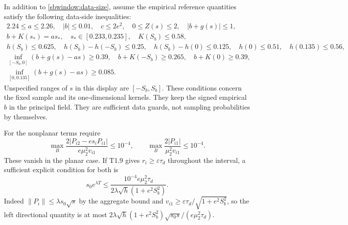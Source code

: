 \documentclass{article} %
\theoremstyle{plain}
\theoremstyle{definition}
\theoremstyle{remark}
\begin{document}
In addition to \eqref{sbwindow:data-size}, assume the empirical reference
quantities satisfy the following data-side inequalities:
\begin{equation}\label{sbwindow:entry-data}
 \begin{gathered}
 2.24\le a\le2.26,\quad |b|\le0.01,\quad
 c\le2e^2,\quad 0\le Z(s)\le2,\quad |b+g(s)|\le1,\\
 b+K(s_*)=as_*,\quad s_*\in[0.233,0.235],\quad K(S_b)\le0.58,\\
 h(S_b)\le0.625,\quad h(S_b)-h(-S_b)\le0.25,\quad
 h(S_b)-h(0)\le0.125,\quad h(0)\le0.51,\quad h(0.135)\le0.56,\\
 \inf_{[-S_b,0]}(b+g(s)-as)\ge0.39,\quad
 b+K(-S_b)\ge0.265,\quad b+K(0)\ge0.39,\\
 \inf_{[0,0.135]}(b+g(s)-as)\ge0.085.
 \end{gathered}
\end{equation}
Unspecified ranges of $s$ in this display are $[-S_b,S_b]$.
These conditions concern the fixed sample and its one-dimensional kernels.
They keep the signed empirical $b$ in the principal field. They are
sufficient data guards, not sampling probabilities by themselves.

For the nonplanar terms require
\begin{equation}\label{sbwindow:ambient}
 \max_B\frac{2|P_{i2}-es_iP_{i1}|}{e\mu_2^2v_{i1}}\le10^{-4},\qquad
 \max_B\frac{2|P_{i1}|}{\mu_2^2v_{i1}}\le10^{-4}.
\end{equation}
These vanish in the planar case. If T1.9 gives
$r_i\ge\varepsilon\tau_d$ throughout the interval, a sufficient explicit
condition for both is
\[
 s_0e^{\lambda T}\le
 \frac{10^{-4}e\mu_2^2\tau_d}
                  {2\lambda\sqrt h(1+e^2S_b^2)}.
\]
Indeed $\|P_i\|\le\lambda s_0\sqrt{s}$ by the aggregate bound and
$v_{i1}\ge\varepsilon\tau_d/\sqrt{1+e^2S_b^2}$, so the left directional
quantity is at most
$2\lambda\sqrt h(1+e^2S_b^2)\sqrt{s_0s}/(e\mu_2^2\tau_d)$.
\end{document}
